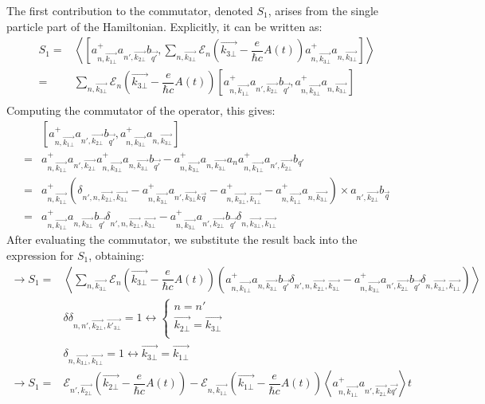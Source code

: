 \documentclass{article}
\begin{document}
The first contribution to the commutator, denoted $S_1$, arises from the single particle part of the Hamiltonian. Explicitly, it can be written as:
\begin{align*}
    S_1 = & \left \langle \left[a^+_{n,\vec{k_{1\bot}}}a_{n',\vec{k_{2\bot}}}b_{\vec{q'}}, \sum_{n,\vec{k_{3\bot}}}\mathcal{E}_{n} \left(\vec{k_{3\bot}}-\dfrac{e}{\hbar c}A(t)\right)a^+_{n,\vec{k_{3\bot}}}a_{n,\vec{k_{3\bot}}}\right] \right \rangle \\
    = & \sum_{n,\vec{k_{3\bot}}}\mathcal{E}_{n}\left(\vec{k_{3\bot}}-\dfrac{e}{\hbar c}A(t)\right)  \left[a^+_{n,\vec{k_{1\bot}}}a_{n',\vec{k_{2\bot}}}b_{\vec{q'}},a^+_{n,\vec{k_{3\bot}}}a_{n,\vec{k_{3\bot}}} \right]  \\
\end{align*}
Computing the commutator of the operator, this gives: 
\begin{align*}
    & \left[a^+_{n,\vec{k_{1\bot}}}a_{n',\vec{k_{2\bot}}}b_{\vec{q'}},a^+_{n,\vec{k_{3\bot}}}a_{n,\vec{k_{3\bot}}} \right]\\
     = & a^+_{n,\vec{k_{1\bot}}}a_{n',\vec{k_{2\bot}}}a^+_{n, \vec{k_{3\bot}}}a_{n, \vec{k_{3\bot}}}b_{\vec{q'}}-a^+_{n,\vec{k_{3\bot}}}a_{n, \vec{k_{3\bot}}}a_na^+_{n, \vec{k_{1\bot}}}a_{n', \vec{k_{2\bot}}}b_{q'}\\
     = & a^+_{n,\vec{k_{1\bot}}} \left(\delta_{n',n,\vec{k_{2\bot}}, \vec{k_{3\bot}}}-a^+_{n, \vec{k_{3\bot}}}a_{n',\vec{k_{3\bot}}k\vec{q}}-a^+_{n,\vec{k_{3\bot}},\vec{k_{1\bot}}}-a^+_{n, \vec{k_{1\bot}}}a_{n,\vec{k_{3\bot}}}\right) \times a_{n',\vec{k_{2\bot}}}b_{\vec{q}}\\
     = & a^+_{n,\vec{k_{1\bot}}} a_{n, \vec{k_{3\bot}}}b_{\vec{q'}}\delta_{n',n, \vec{k_{2\bot}}, \vec{k_{3\bot}}}- a^+_{n, \vec{k_{3\bot}}}a_{n', \vec{k_{2\bot}}}b_{\vec{q'}} \delta_{n, \vec{k_{3\bot}}, \vec{k_{1\bot}}}
\end{align*}
After evaluating the commutator, we substitute the result back into the expression for $S_1$, obtaining:
\begin{align*}
    \rightarrow S_1 = & \left\langle \sum_{n,\vec{k_{3\bot}}} \mathcal{E}_{n}\left(\vec{k_{3\bot}}-\dfrac{e}{\hbar c}A(t)\right) \left(a^+_{n,\vec{k_{1\bot}}} a_{n, \vec{k_{3\bot}}}b_{\vec{q'}}\delta_ {n',n, \vec{k_{2\bot}}, \vec{k_{3\bot}}}- a^+_{n, \vec{k_{3\bot}}}a_{n', \vec{k_{2\bot}}}b_{\vec{q'}}\delta_{n, \vec{k_{3\bot}}, \vec{k_{1\bot}}} \right)\right\rangle \\
    & \delta\delta_{n,n', \vec{k_{2\bot}},\vec{k'_{3\bot}}}=1 \leftrightarrow \begin{cases}
        n = n'\\
        \vec{k_{2\bot}}= \vec{k_{3\bot}}\\
    \end{cases} \\
    & \delta_{n, \vec{k_{3\bot}}, \vec{k_{1\bot}}}= 1 \leftrightarrow \vec{k_{3\bot}} = \vec{k_{1\bot}}\\
    \rightarrow S_1 = & \mathcal{E}_{n',\vec{k_{2\bot}}}\left(\vec{k_{2\bot}}-\dfrac{e}{\hbar c}A(t)\right)-\mathcal{E}_{n, \vec{k_{1\bot}}}\left(\vec{k_{1\bot}}-\dfrac{e}{\hbar c}A(t)\right)\left \langle a^+_{n, \vec{k_{1\bot}}}a_{n',\vec{k_{2\bot}}k\vec{q'}}\right \rangle t \\
\end{align*}
\end{document}
